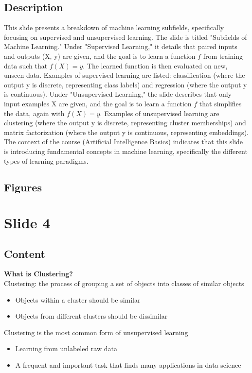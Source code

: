 \documentclass{article}%
\begin{document}
\subsection{Description}%
This slide presents a breakdown of machine learning subfields, specifically focusing on supervised and unsupervised learning.  The slide is titled "Subfields of Machine Learning."  Under "Supervised Learning," it details that paired inputs and outputs (X, y) are given, and the goal is to learn a function $f$ from training data such that $f(X) = y$.  The learned function is then evaluated on new, unseen data.  Examples of supervised learning are listed: classification (where the output y is discrete, representing class labels) and regression (where the output y is continuous).  Under "Unsupervised Learning," the slide describes that only input examples X are given, and the goal is to learn a function $f$ that simplifies the data, again with $f(X) = y$.  Examples of unsupervised learning are clustering (where the output y is discrete, representing cluster memberships) and matrix factorization (where the output y is continuous, representing embeddings). The context of the course (Artificial Intelligence Basics) indicates that this slide is introducing fundamental concepts in machine learning, specifically the different types of learning paradigms.%
\subsection{Figures}%
\begin{figure}[H]%
\centering%
\end{figure}

%
\newpage%
\section{Slide 4}%
\label{sec:Slide4}%
\subsection{Content}%

\textbf{What is Clustering?} \\
Clustering: the process of grouping a set of objects into classes of similar objects \\
\begin{itemize}
\item Objects within a cluster should be similar
\item Objects from different clusters should be dissimilar
\end{itemize}
Clustering is the most common form of unsupervised learning \\
\begin{itemize}
\item Learning from unlabeled raw data
\item A frequent and important task that finds many applications in data science
\end{itemize}
%
\end{document}
